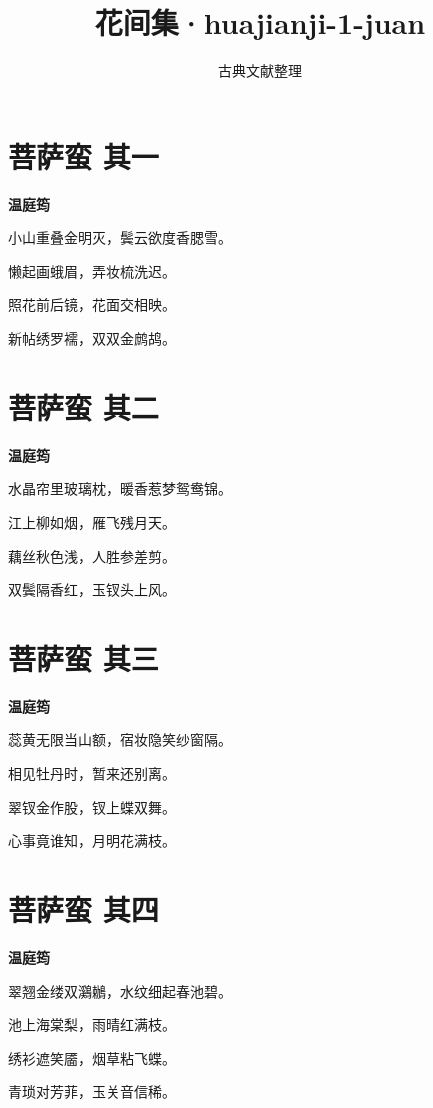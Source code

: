 \documentclass[12pt,a4paper]{ctexbook}
\title{花间集·huajianji-1-juan}
\author{古典文献整理}
\date{}
\begin{document}
\maketitle
\tableofcontents
\newpage
\section{菩萨蛮 其一}
\textbf{温庭筠}\par\vspace{0.5em}
小山重叠金明灭，鬓云欲度香腮雪。\par
懒起画蛾眉，弄妆梳洗迟。\par
照花前后镜，花面交相映。\par
新帖绣罗襦，双双金鹧鸪。\par

\section{菩萨蛮 其二}
\textbf{温庭筠}\par\vspace{0.5em}
水晶帘里玻璃枕，暖香惹梦鸳鸯锦。\par
江上柳如烟，雁飞残月天。\par
藕丝秋色浅，人胜参差剪。\par
双鬓隔香红，玉钗头上风。\par

\section{菩萨蛮 其三}
\textbf{温庭筠}\par\vspace{0.5em}
蕊黄无限当山额，宿妆隐笑纱窗隔。\par
相见牡丹时，暂来还别离。\par
翠钗金作股，钗上蝶双舞。\par
心事竟谁知，月明花满枝。\par

\section{菩萨蛮 其四}
\textbf{温庭筠}\par\vspace{0.5em}
翠翘金缕双鸂鶒，水纹细起春池碧。\par
池上海棠梨，雨晴红满枝。\par
绣衫遮笑靥，烟草粘飞蝶。\par
青琐对芳菲，玉关音信稀。\par
\end{document}
